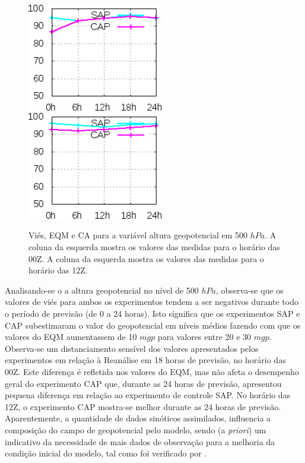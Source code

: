 \begin{figure}[!hbp]
\includegraphics[height=4.7cm]{./figs/CA500zgeo0Z.png}\hspace{1.0cm}\includegraphics[height=4.7cm]{./figs/CA500zgeo12Z.png}
\caption{Viés, EQM e CA para a variável altura geopotencial em 500 $hPa$. A coluna da esquerda mostra os valores das medidas para o horário das 00Z. A coluna da esquerda mostra os valores das medidas para o horário das 12Z.}
\label{fig54}
\end{figure}

\break

Analisando-se o a altura geopotencial no nível de 500 $hPa$, observa-se que os valores de viés para ambos os experimentos tendem a ser negativos durante todo o período de previsão (de 0 a 24 horas). Isto significa que os experimentos SAP e CAP subestimaram o valor do geopotencial em níveis médios fazendo com que os valores do EQM aumentassem de 10 $mgp$ para valores entre 20 e 30 $mgp$. Observa-se um distanciamento sensível dos valores apresentados pelos experimentos em relação à Reanálise em 18 horas de previsão, no horário das 00Z. Este diferença é refletida nos valores do EQM, mas não afeta o desempenho geral do experimento CAP que, durante as 24 horas de previsão, apresentou pequena diferença em relação ao experimento de controle SAP. No horário das 12Z, o experimento CAP mostra-se melhor durante as 24 horas de previsão. Aparentemente, a quantidade de dados sinóticos assimilados, influencia a composição do campo de geopotencial pelo modelo, sendo (a \textit{priori}) um indicativo da necessidade de mais dados de observação para a melhoria da condição inicial do modelo, tal como foi verificado por .

